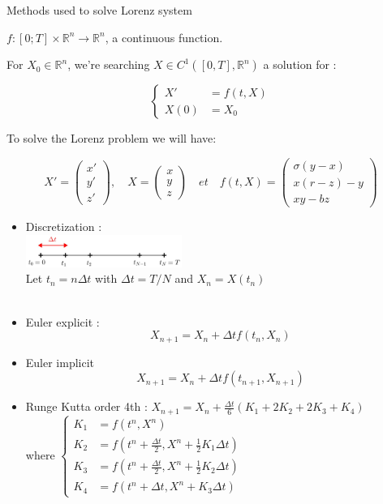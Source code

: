 \documentclass[10pt,xcolor={table,dvipsnames},t]{beamer}
\begin{document}
	\begin{frame}[allowframebreaks]{Methods used to solve Lorenz system}
		
		$f : [0; T] \times \mathbb{R}^n \rightarrow \mathbb{R}^n$, \; a continuous function.
		
		For $X_0\in \mathbb{R}^n$, we're searching $X\in C^1([0,T],\mathbb{R}^n)$ a solution for :
		
		$$\left\{\begin{aligned}
			X'&=f(t,X) \\
			X(0)&=X_0
		\end{aligned}\right.$$
		
		To solve the Lorenz problem we will have:
		
		$$X'=\begin{pmatrix}
			x' \\
			y' \\
			z'
		\end{pmatrix}, \quad X=\begin{pmatrix}
			x \\
			y \\
			z
		\end{pmatrix} \quad et \quad f(t,X)=\begin{pmatrix}
			\sigma(y-x) \\
			x(r-z)-y \\
			xy-bz
		\end{pmatrix}$$
		
		\newpage
		
		\begin{itemize}
			\item Discretization : \\
			\quad \includegraphics[width=0.4\textwidth]{images/discretization.jpg} \\ 
			Let \quad $t_n=n\Delta t$ \quad with \quad $\Delta t=T/N$ \quad and \quad $X_n=X(t_n)$ \\ \; \\
			\item Euler explicit :
			$$X_{n+1}=X_n+\Delta t f(t_n,X_n)$$
			\item Euler implicit
			$$X_{n+1}=X_n+\Delta t f(t_{n+1},X_{n+1})$$
			
			\newpage
			
			\item Runge Kutta order 4th : \qquad
			$X_{n+1}=X_n+\frac{\Delta t}{6}\left(K_1+2K_2+2K_3+K_4\right)$ \\
			where \qquad $\left\{\begin{aligned}
				K_1&=f(t^n,X^n) \\
				K_2&=f\left(t^n+\frac{\Delta t}{2},X^n+\frac{1}{2} K_1\Delta t\right) \\
				K_3&=f\left(t^n+\frac{\Delta t}{2},X^n+\frac{1}{2} K_2\Delta t\right) \\
				K_4&=f\left(t^n+\Delta t,X^n+K_3\Delta t\right)
			\end{aligned}\right.$ \\ \; \\ \; \\
			

\end{itemize}
\end{frame}
\end{document}
